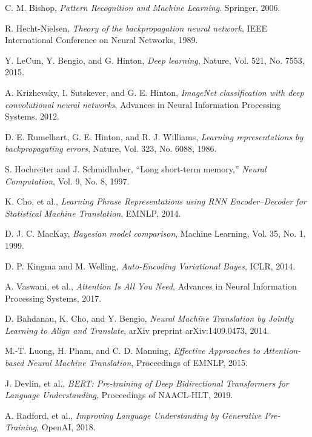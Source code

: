 \begin{thebibliography}{99}
    C. M. Bishop, \textit{Pattern Recognition and Machine Learning}. Springer, 2006.

    R. Hecht-Nielsen, \textit{Theory of the backpropagation neural network}, IEEE International Conference on Neural Networks, 1989.

    Y. LeCun, Y. Bengio, and G. Hinton, \textit{Deep learning}, Nature, Vol. 521, No. 7553, 2015.

    A. Krizhevsky, I. Sutskever, and G. E. Hinton, \textit{ImageNet classification with deep convolutional neural networks}, Advances in Neural Information Processing Systems, 2012.

    D. E. Rumelhart, G. E. Hinton, and R. J. Williams, \textit{Learning representations by backpropagating errors}, Nature, Vol. 323, No. 6088, 1986.

    S. Hochreiter and J. Schmidhuber, “Long short-term memory,” \textit{Neural Computation}, Vol. 9, No. 8, 1997.

    K. Cho, et al., \textit{Learning Phrase Representations using RNN Encoder–Decoder for Statistical Machine Translation}, EMNLP, 2014.

    D. J. C. MacKay, \textit{Bayesian model comparison}, Machine Learning, Vol. 35, No. 1, 1999.

    D. P. Kingma and M. Welling, \textit{Auto-Encoding Variational Bayes}, ICLR, 2014.

    A. Vaswani, et al., \textit{Attention Is All You Need}, Advances in Neural Information Processing Systems, 2017.

    D. Bahdanau, K. Cho, and Y. Bengio, \textit{Neural Machine Translation by Jointly Learning to Align and Translate}, arXiv preprint arXiv:1409.0473, 2014.
    
    M.-T. Luong, H. Pham, and C. D. Manning, \textit{Effective Approaches to Attention-based Neural Machine Translation}, Proceedings of EMNLP, 2015.
    
    J. Devlin, et al., \textit{BERT: Pre-training of Deep Bidirectional Transformers for Language Understanding}, Proceedings of NAACL-HLT, 2019.
    
    A. Radford, et al., \textit{Improving Language Understanding by Generative Pre-Training}, OpenAI, 2018.
    

\end{thebibliography}
